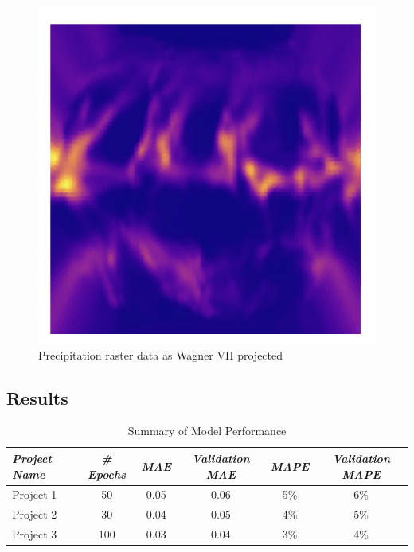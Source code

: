 \begin{figure}[h]
    \begin{minipage}{0.30\textwidth}
        \centering
        \includegraphics[width=0.9\linewidth]{figures/chapter-8/prect_wag.png}
        \caption{Precipitation raster data as Wagner VII projected}
        \label{fig:wag_prect_raster}
    \end{minipage}\hfill
\end{figure}

\subsection{Results}
\begin{table}[ht]
    \centering
    \caption{Summary of Model Performance}
    \label{planner_results_table}
    \renewcommand{\arraystretch}{1.2} %
    \begin{tabular}{|l|c|c|c|c|c|}
        \hline
        \rowcolor[gray]{0.9}
        \textbf{\emph{Project Name}} & \textbf{\emph{\# Epochs}} & \textbf{\emph{MAE}} & \textbf{\emph{Validation MAE}} & \textbf{\emph{MAPE}} & \textbf{\emph{Validation MAPE}} \\ \hline
        Project 1                    & 50                        & 0.05                & 0.06                           & 5\%                  & 6\%                             \\ \hline
        Project 2                    & 30                        & 0.04                & 0.05                           & 4\%                  & 5\%                             \\ \hline
        Project 3                    & 100                       & 0.03                & 0.04                           & 3\%                  & 4\%                             \\ \hline
    \end{tabular}
\end{table}
